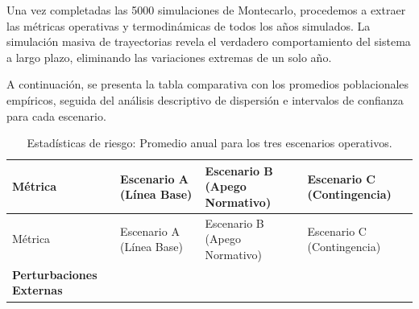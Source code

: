 \documentclass[
  spanish,
  letterpaper,
  DIV=11,
  numbers=noendperiod]{scrreprt}
\theoremstyle{plain}
\theoremstyle{plain}
\theoremstyle{plain}
\theoremstyle{definition}
\theoremstyle{remark}
\begin{document}
Una vez completadas las 5000 simulaciones de Montecarlo, procedemos a
extraer las métricas operativas y termodinámicas de todos los años
simulados. La simulación masiva de trayectorias revela el verdadero
comportamiento del sistema a largo plazo, eliminando las variaciones
extremas de un solo año.

A continuación, se presenta la tabla comparativa con los promedios
poblacionales empíricos, seguida del análisis descriptivo de dispersión
e intervalos de confianza para cada escenario.

\begin{longtable}[]{@{}
  >{\raggedright\arraybackslash}p{}
  >{\centering\arraybackslash}p{}
  >{\centering\arraybackslash}p{}
  >{\centering\arraybackslash}p{}@{}}
\caption{Estadísticas de riesgo: Promedio anual para los tres escenarios
operativos.}\label{tbl-riesgo-operativo}\tabularnewline
\toprule\noalign{}
\begin{minipage}[b]{\linewidth}\raggedright
Métrica
\end{minipage} & \begin{minipage}[b]{\linewidth}\centering
Escenario A (Línea Base)
\end{minipage} & \begin{minipage}[b]{\linewidth}\centering
Escenario B (Apego Normativo)
\end{minipage} & \begin{minipage}[b]{\linewidth}\centering
Escenario C (Contingencia)
\end{minipage} \\
\midrule\noalign{}
\endfirsthead
\toprule\noalign{}
\begin{minipage}[b]{\linewidth}\raggedright
Métrica
\end{minipage} & \begin{minipage}[b]{\linewidth}\centering
Escenario A (Línea Base)
\end{minipage} & \begin{minipage}[b]{\linewidth}\centering
Escenario B (Apego Normativo)
\end{minipage} & \begin{minipage}[b]{\linewidth}\centering
Escenario C (Contingencia)
\end{minipage} \\
\midrule\noalign{}
\endhead
\bottomrule\noalign{}
\endlastfoot
\textbf{Perturbaciones Externas} & & & \\

\end{longtable}
\end{document}
